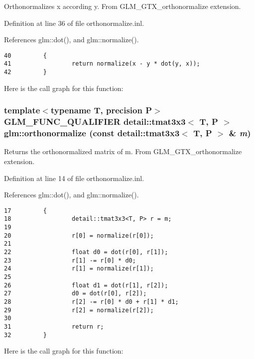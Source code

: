 Orthonormalizes x according y. From GLM\_\-GTX\_\-orthonormalize extension. 

Definition at line 36 of file orthonormalize.inl.

References glm::dot(), and glm::normalize().

\begin{Code}\begin{verbatim}40         {
41                 return normalize(x - y * dot(y, x));
42         }
\end{verbatim}
\end{Code}




Here is the call graph for this function:\hypertarget{group__gtx__orthonormalize_ge0c06d8312a13b38747271ea68f00121}{
\subsubsection[orthonormalize]{\setlength{\rightskip}{0pt plus 5cm}template$<$typename T, precision P$>$ GLM\_\-FUNC\_\-QUALIFIER detail::tmat3x3$<$ T, P $>$ glm::orthonormalize (const detail::tmat3x3$<$ T, P $>$ \& {\em m})}}
\label{group__gtx__orthonormalize_ge0c06d8312a13b38747271ea68f00121}


Returns the orthonormalized matrix of m. From GLM\_\-GTX\_\-orthonormalize extension. 

Definition at line 14 of file orthonormalize.inl.

References glm::dot(), and glm::normalize().

\begin{Code}\begin{verbatim}17         {
18                 detail::tmat3x3<T, P> r = m;
19 
20                 r[0] = normalize(r[0]);
21 
22                 float d0 = dot(r[0], r[1]);
23                 r[1] -= r[0] * d0;
24                 r[1] = normalize(r[1]);
25 
26                 float d1 = dot(r[1], r[2]);
27                 d0 = dot(r[0], r[2]);
28                 r[2] -= r[0] * d0 + r[1] * d1;
29                 r[2] = normalize(r[2]);
30 
31                 return r;
32         }
\end{verbatim}
\end{Code}




Here is the call graph for this function: